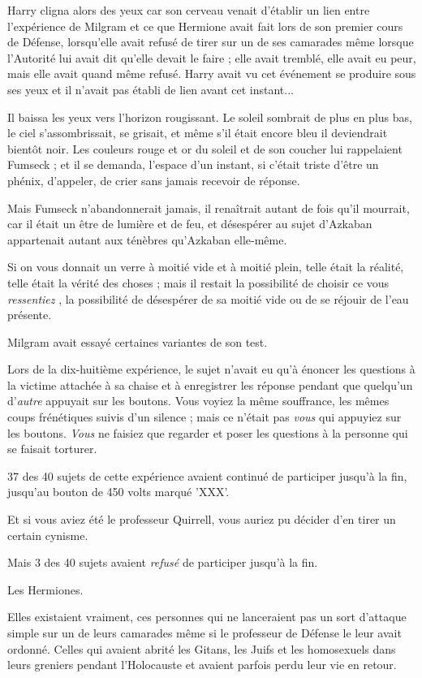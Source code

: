 Harry cligna alors des yeux car son cerveau venait d'établir un lien entre l'expérience de Milgram et ce que Hermione avait fait lors de son premier cours de Défense, lorsqu'elle avait refusé de tirer sur un de ses camarades même lorsque l'Autorité lui avait dit qu'elle devait le faire ; elle avait tremblé, elle avait eu peur, mais elle avait quand même refusé. Harry avait vu cet événement se produire sous ses yeux et il n'avait pas établi de lien avant cet instant...

Il baissa les yeux vers l'horizon rougissant. Le soleil sombrait de plus en plus bas, le ciel s'assombrissait, se grisait, et même s'il était encore bleu il deviendrait bientôt noir. Les couleurs rouge et or du soleil et de son coucher lui rappelaient Fumseck ; et il se demanda, l'espace d'un instant, si c'était triste d'être un phénix, d'appeler, de crier sans jamais recevoir de réponse.

Mais Fumseck n'abandonnerait jamais, il renaîtrait autant de fois qu'il mourrait, car il était un être de lumière et de feu, et désespérer au sujet d'Azkaban appartenait autant aux ténèbres qu'Azkaban elle-même.

Si on vous donnait un verre à moitié vide et à moitié plein, telle était la réalité, telle était la vérité des choses ; mais il restait la possibilité de choisir ce vous \emph{ressentiez} , la possibilité de désespérer de sa moitié vide ou de se réjouir de l'eau présente.

Milgram avait essayé certaines variantes de son test.

Lors de la dix-huitième expérience, le sujet n'avait eu qu'à énoncer les questions à la victime attachée à sa chaise et à enregistrer les réponse pendant que quelqu'un d'\emph{autre}  appuyait sur les boutons. Vous voyiez la même souffrance, les mêmes coups frénétiques suivis d'un silence ; mais ce n'était pas \emph{vous}  qui appuyiez sur les boutons. \emph{Vous}  ne faisiez que regarder et poser les questions à la personne qui se faisait torturer.

37 des 40 sujets de cette expérience avaient continué de participer jusqu'à la fin, jusqu'au bouton de 450 volts marqué 'XXX'.

Et si vous aviez été le professeur Quirrell, vous auriez pu décider d'en tirer un certain cynisme.

Mais 3 des 40 sujets avaient \emph{refusé}  de participer jusqu'à la fin.

Les Hermiones.

Elles existaient vraiment, ces personnes qui ne lanceraient pas un sort d'attaque simple sur un de leurs camarades même si le professeur de Défense le leur avait ordonné. Celles qui avaient abrité les Gitans, les Juifs et les homosexuels dans leurs greniers pendant l'Holocauste et avaient parfois perdu leur vie en retour.

